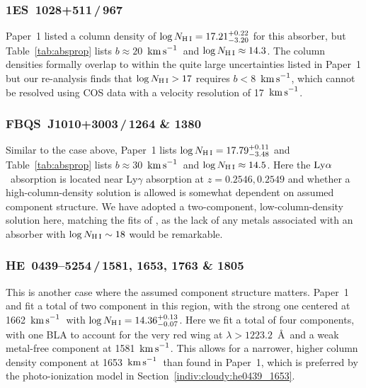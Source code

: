 \documentclass[twocolumn,twocolappendix,tighten,times]{aastex6}
\newcommand{\kms}{\ensuremath{{\rm km\,s}^{-1}}}
\newcommand{\lya}{\ensuremath{{\rm Ly}\alpha}}
\begin{document}
\subsubsection{1ES~1028+511\,/\,967}
\label{indiv:absorbers:1es1028_967}

Paper~1 listed a column density of $\log{N_{\rm H\,I}} =
17.21^{+0.22}_{-3.20}$  for this absorber, but Table~\ref{tab:absprop}
lists $b\approx20$~\kms\ and $\log{N_{\rm H\,I}} \approx 14.3$. The
column densities formally overlap to  within the quite large
uncertainties listed in Paper~1 but our re-analysis finds that
$\log{N_{\rm H\,I}}>17$ requires $b<8$~\kms, which cannot  be resolved
using COS data with a velocity resolution of 17~\kms.


\subsubsection{FBQS~J1010+3003\,/\,1264 \& 1380}
\label{indiv:absorbers:f1010_1380}

Similar to the case above, Paper~1 lists $\log{N_{\rm H\,I}} =
17.79^{+0.11}_{-3.48}$ and Table~\ref{tab:absprop} lists
$b\approx30$~\kms\  and $\log{N_{\rm H\,I}}\approx14.5$. Here the
\lya\ absorption is located  near Ly$\gamma$ absorption at
$z=0.2546,0.2549$ \citep{danforth16} and whether  a
high-column-density solution is allowed is somewhat dependent on
assumed  component structure. We have adopted a two-component,
low-column-density solution here, matching the fits of 
\citet{danforth16}, as the lack of any metals associated
with an absorber with $\log{N_{\rm H\,I}}\sim18$ would be remarkable.


\subsubsection{HE~0439--5254\,/\,1581, 1653, 1763 \& 1805}
\label{indiv:absorbers:he0439_1653}

This is another case where the assumed component structure
matters. Paper~1 and  \citet{keeney13} fit a total of two component in
this region, with the strong one  centered at 1662~\kms\ with
$\log{N_{\rm H\,I}} = 14.36^{+0.13}_{-0.07}$. Here we  fit a total of
four components, with one BLA to account for the very red wing at
$\lambda>1223.2$~\AA\ and a weak metal-free component at
1581~\kms. This allows for a narrower, higher column density component
at 1653~\kms\ than found in  Paper~1, which is preferred by the
photo-ionization model in Section~\ref{indiv:cloudy:he0439_1653}.
\end{document}
